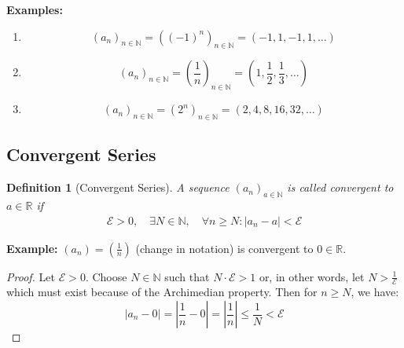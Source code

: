 \documentclass[12pt]{article}
\newtheorem{definition}{Definition}
\begin{document}
\noindent
\textbf{Examples:}
\begin{enumerate}
    \item 
        \[
            (a_n)_{n \in \mathbb N} = ((-1)^n)_{n\in \mathbb N}
            = (-1, 1, -1, 1, \dots)
        \]

    \item  
        \[
            (a_n)_{n\in \mathbb N} = \left(\frac{1}{n}\right)_{n\in\mathbb N} 
            = (1, \frac{1}{2}, \frac{1}{3}, \dots)
        \] 

    \item 
        \[ 
            (a_n)_{n \in \mathbb N} = (2^n)_{n\in \mathbb N}
            = (2, 4, 8, 16, 32, \dots)
        \]
\end{enumerate}

\subsection*{Convergent Series}
\begin{definition}[Convergent Series]
    A sequence \((a_n)_{a\in \mathbb N}\) is called convergent to \(a\in \mathbb R\) if
    \begin{gather*}
        \mathcal E > 0, \quad \exists N \in \mathbb N, \quad
        \forall n \geq N : |a_n - a | < \mathcal E
    \end{gather*}
\end{definition}

\noindent 
\textbf{Example:}
\((a_n) = (\frac{1}{n})\) (change in notation) is convergent to \(0 \in \mathbb R\).

\begin{proof}
    Let \(\mathcal E > 0\). Choose \(N \in \mathbb N\) such that 
    \(N \cdot \mathcal E > 1\) or, in other words, let \(N > \frac{1}{\mathcal E}\) 
    which must exist because of the Archimedian property.
    Then for \(n \geq N\), we have:
    \[
        |a_n - 0| = |\frac{1}{n} - 0| = |\frac{1}{n}| \leq \frac{1}{N}
        < \mathcal E
    \]
\end{proof}
\end{document}
